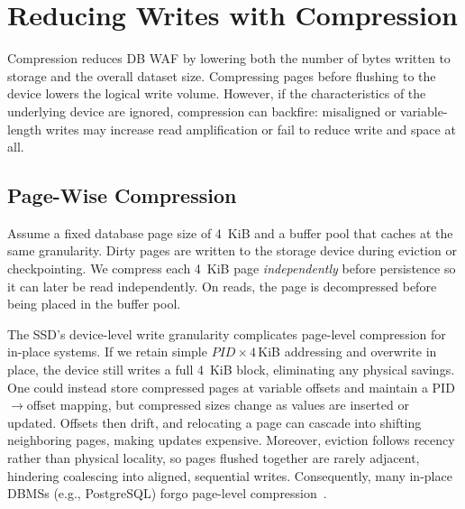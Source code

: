 \section{Reducing Writes with Compression}\label{sec:comppagepack}
Compression reduces DB WAF by lowering both the number of bytes written to storage and the overall dataset size.
Compressing pages before flushing to the device lowers the logical write volume.
However, if the characteristics of the underlying device are ignored, 
compression can backfire: misaligned or variable-length writes may increase read amplification or fail to reduce write and space at all.

\subsection{Page-Wise Compression}\label{sec:comp}
Assume a fixed database page size of 4~KiB and a buffer pool that caches at the same granularity.
Dirty pages are written to the storage device during eviction or checkpointing.
We compress each 4~KiB page \emph{independently} before persistence so it can later be read independently.
On reads, the page is decompressed before being placed in the buffer pool.

The SSD’s device-level write granularity complicates page-level compression for in-place systems.
If we retain simple $PID \times 4\,$KiB addressing and overwrite in place, the device still writes a full 4~KiB block, eliminating any physical savings.
One could instead store compressed pages at variable offsets and maintain a PID$\rightarrow$offset mapping, but compressed sizes change as values are inserted or updated.
Offsets then drift, and relocating a page can cascade into shifting neighboring pages, making updates expensive.
Moreover, eviction follows recency rather than physical locality, so pages flushed together are rarely adjacent, hindering coalescing into aligned, sequential writes.
Consequently, many in-place DBMSs (e.g., PostgreSQL) forgo page-level compression~\cite{postgresql-toast}.

